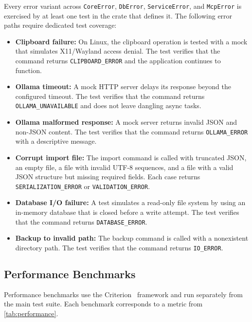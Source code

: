 \documentclass[a4paper, 11pt, oneside]{report}
\begin{document}
Every error variant across \texttt{CoreError}, \texttt{DbError},
\texttt{ServiceError}, and \texttt{McpError} is exercised by at least
one test in the crate that defines it.  The following error paths
require dedicated test coverage:

\begin{itemize}
  \item \textbf{Clipboard failure:} On Linux, the clipboard operation
        is tested with a mock that simulates X11/Wayland access
        denial.  The test verifies that the command returns
        \texttt{CLIPBOARD\_ERROR} and the application continues
        to function.
  \item \textbf{Ollama timeout:} A mock HTTP server delays its
        response beyond the configured timeout.  The test verifies
        that the command returns \texttt{OLLAMA\_UNAVAILABLE} and
        does not leave dangling async tasks.
  \item \textbf{Ollama malformed response:} A mock server returns
        invalid JSON and non-JSON content.  The test verifies that
        the command returns \texttt{OLLAMA\_ERROR} with a
        descriptive message.
  \item \textbf{Corrupt import file:} The import command is called
        with truncated JSON, an empty file, a file with invalid
        UTF-8 sequences, and a file with a valid JSON structure
        but missing required fields.  Each case returns
        \texttt{SERIALIZATION\_ERROR} or \texttt{VALIDATION\_ERROR}.
  \item \textbf{Database I/O failure:} A test simulates a read-only
        file system by using an in-memory database that is closed
        before a write attempt.  The test verifies that the command
        returns \texttt{DATABASE\_ERROR}.
  \item \textbf{Backup to invalid path:} The backup command is
        called with a nonexistent directory path.  The test verifies
        that the command returns \texttt{IO\_ERROR}.
\end{itemize}

\subsection{Performance Benchmarks}
\label{sec:benchmarks}

Performance benchmarks use the Criterion~\cite{criterion} framework
and run separately from the main test suite.  Each benchmark
corresponds to a metric from \cref{tab:performance}.
\end{document}
